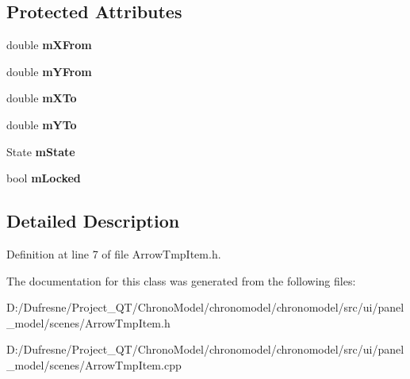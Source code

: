 \subsection*{Protected Attributes}
\begin{DoxyCompactItemize}
\item 
\hypertarget{class_arrow_tmp_item_ac3e053c965799386d1aa3197e5463591}{double {\bfseries m\-X\-From}}\label{class_arrow_tmp_item_ac3e053c965799386d1aa3197e5463591}

\item 
\hypertarget{class_arrow_tmp_item_adbacbb4927dba024d48c6ef024706bca}{double {\bfseries m\-Y\-From}}\label{class_arrow_tmp_item_adbacbb4927dba024d48c6ef024706bca}

\item 
\hypertarget{class_arrow_tmp_item_ad1e65203ffaecdf9bacd459385a5c14f}{double {\bfseries m\-X\-To}}\label{class_arrow_tmp_item_ad1e65203ffaecdf9bacd459385a5c14f}

\item 
\hypertarget{class_arrow_tmp_item_a7ef4a3e3189360917518b7d8ee01cd78}{double {\bfseries m\-Y\-To}}\label{class_arrow_tmp_item_a7ef4a3e3189360917518b7d8ee01cd78}

\item 
\hypertarget{class_arrow_tmp_item_a0fec8e75a39e0253cfe00b88bf869494}{State {\bfseries m\-State}}\label{class_arrow_tmp_item_a0fec8e75a39e0253cfe00b88bf869494}

\item 
\hypertarget{class_arrow_tmp_item_a4cdb36a5445cbb8cc782c1b22561599d}{bool {\bfseries m\-Locked}}\label{class_arrow_tmp_item_a4cdb36a5445cbb8cc782c1b22561599d}

\end{DoxyCompactItemize}


\subsection{Detailed Description}


Definition at line 7 of file Arrow\-Tmp\-Item.\-h.



The documentation for this class was generated from the following files\-:\begin{DoxyCompactItemize}
\item 
D\-:/\-Dufresne/\-Project\-\_\-\-Q\-T/\-Chrono\-Model/chronomodel/chronomodel/src/ui/panel\-\_\-model/scenes/Arrow\-Tmp\-Item.\-h\item 
D\-:/\-Dufresne/\-Project\-\_\-\-Q\-T/\-Chrono\-Model/chronomodel/chronomodel/src/ui/panel\-\_\-model/scenes/Arrow\-Tmp\-Item.\-cpp\end{DoxyCompactItemize}
